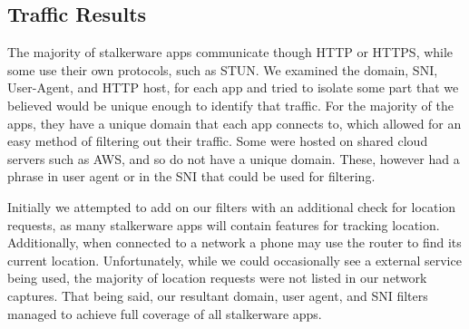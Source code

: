 \documentclass[acmtog]{acmart}
\begin{document}
\subsection{Traffic Results}

The majority of stalkerware apps communicate though HTTP or HTTPS, while some 
use their own protocols, such as STUN. We examined the domain, SNI, User-Agent, and HTTP 
host, for each app and tried to isolate some part that we believed would be unique enough to identify that traffic. For the majority of the apps, they have a unique domain that each app connects to, which allowed for an easy method of filtering out their traffic. Some were hosted on shared cloud servers such as AWS, and so do not have a unique domain. These, however had a phrase in user agent or in the SNI that could be used for filtering.

Initially we attempted to add on our filters with an additional check for location requests, as many stalkerware apps will contain features for tracking location. Additionally, when connected to a network a phone may use the router to find its current location. Unfortunately, while we could occasionally see a external service being used, the majority of location requests were not listed in our network captures. That being said, our resultant domain, user agent, and SNI filters managed to achieve full coverage of all stalkerware apps.
\end{document}
